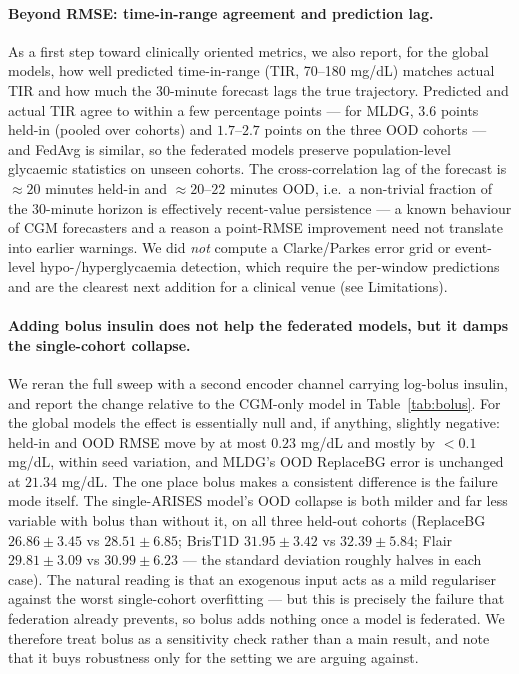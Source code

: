 \documentclass[10pt,letterpaper]{article}
\begin{document}
\paragraph{Beyond RMSE: time-in-range agreement and prediction lag.} As a first
step toward clinically oriented metrics, we also report, for the global models,
how well predicted time-in-range (TIR, 70--180 mg/dL) matches actual TIR and how
much the 30-minute forecast lags the true trajectory. Predicted and actual TIR
agree to within a few percentage points --- for MLDG, $3.6$ points held-in
(pooled over cohorts) and $1.7$--$2.7$ points on the three OOD cohorts --- and
FedAvg is similar, so the federated models preserve population-level glycaemic
statistics on unseen cohorts. The cross-correlation lag of the forecast is
$\approx 20$ minutes held-in and $\approx 20$--$22$ minutes OOD, i.e.\ a
non-trivial fraction of the 30-minute horizon is effectively recent-value
persistence --- a known behaviour of CGM forecasters and a reason a point-RMSE
improvement need not translate into earlier warnings. We did \emph{not} compute a
Clarke/Parkes error grid or event-level hypo-/hyperglycaemia detection, which
require the per-window predictions and are the clearest next addition for a
clinical venue (see Limitations).

\paragraph{Adding bolus insulin does not help the federated models, but it damps
the single-cohort collapse.} We reran the full sweep with a second encoder
channel carrying log-bolus insulin, and report the change relative to the
CGM-only model in Table~\ref{tab:bolus}. For the global models the effect is
essentially null and, if anything, slightly negative: held-in and OOD RMSE move by
at most $0.23$ mg/dL and mostly by $<0.1$ mg/dL, within seed variation, and MLDG's
OOD ReplaceBG error is unchanged at $21.34$ mg/dL. The one place bolus makes a
consistent difference is the failure mode itself. The single-ARISES model's OOD
collapse is both milder and far less variable with bolus than without it, on all
three held-out cohorts (ReplaceBG $26.86 \pm 3.45$ vs $28.51 \pm 6.85$; BrisT1D
$31.95 \pm 3.42$ vs $32.39 \pm 5.84$; Flair $29.81 \pm 3.09$ vs $30.99 \pm 6.23$
--- the standard deviation roughly halves in each case). The natural reading is
that an exogenous input acts as a mild regulariser against the worst
single-cohort overfitting --- but this is precisely the failure that federation
already prevents, so bolus adds nothing once a model is federated. We therefore
treat bolus as a sensitivity check rather than a main result, and note that it
buys robustness only for the setting we are arguing against.
\end{document}
